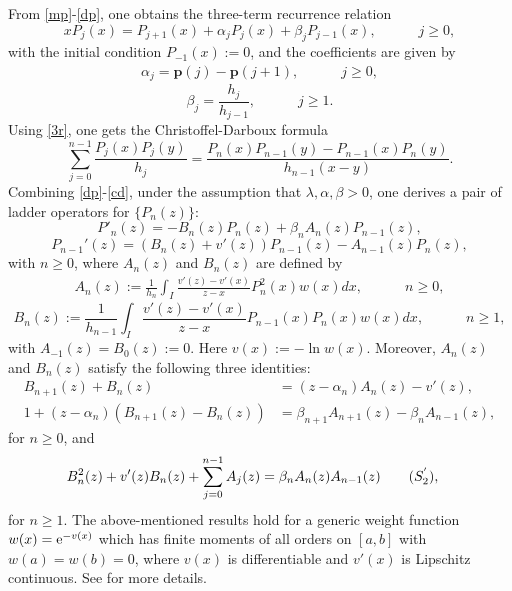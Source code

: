 \documentclass[12pt,a4paper]{article}    %
\numberwithin{equation}{section}
\begin{document}
From \eqref{mp}-\eqref{dp}, one obtains the three-term recurrence relation
\begin{equation}\label{3r}	 xP_j(x)=P_{j+1}(x)+\alpha_jP_j(x)+\beta_jP_{j-1}(x),\quad\qquad j\geq0,
\end{equation}
with the initial condition $P_{-1}(x):=0$, and the coefficients are given by
\begin{align}\label{alp}
\alpha_j=\textbf{p}(j)-\textbf{p}(j+1),\quad\qquad j\geq0,
\end{align}
\begin{equation}\label{bth}
	\beta_j=\frac{h_j}{h_{j-1}},\quad\qquad j\geq1.
\end{equation}
Using \eqref{3r}, one gets the Christoffel-Darboux formula
\begin{equation}\label{cd}	 \sum_{j=0}^{n-1}\frac{P_j(x)P_j(y)}{h_j}=\frac{P_n(x)P_{n-1}(y)-P_{n-1}(x)P_n(y)}{h_{n-1}(x-y)}.
\end{equation}
Combining \eqref{dp}-\eqref{cd}, under the assumption that $\lambda,\alpha,\beta>0$, one derives a pair of ladder operators for $\{P_n(z)\}$:
	\begin{equation*}
P'_n(z)=-B_n(z)P_n(z)+\beta_nA_n(z)P_{n-1}(z),
	\end{equation*}
	\begin{equation*}
P_{n-1}'(z)=\left(B_n(z)+v'(z)\right)P_{n-1}(z)-A_{n-1}(z)P_n(z),
	\end{equation*}
with $n\geq0$, where $A_n(z)$ and $B_n(z)$ are defined by
	\begin{align}\label{a-n}		 A_n(z):=\frac{1}{h_n}\int_I\frac{v'(z)-v'(x)}{z-x}P_n^2(x)w(x)dx,\quad\qquad n\geq0,
	\end{align}
	\begin{equation}\label{b-n}		 B_n(z):=\frac{1}{h_{n-1}}\int_I\frac{v'(z)-v'(x)}{z-x}P_{n-1}(x)P_n(x)w(x)dx,\quad\qquad n\geq1,
\end{equation}
with $A_{-1}(z)=B_0(z):=0$. Here $v(x):=-\ln w(x)$. Moreover, $A_n(z)$ and $B_n(z)$ satisfy the following three identities:
 \begin{align}
B_{n+1}(z)+B_n(z)&=(z-\alpha_n)A_n(z)-v'(z)\tag{$S_1$},\\
1+(z-\alpha_n)(B_{n+1}(z)-B_n(z))&=\beta_{n+1}A_{n+1}(z)-\beta_nA_{n-1}(z)\tag{$S_2$},			 \end{align}
for $n\geq0$, and
\begin{align}
B^2_n(z)+v'(z)B_n(z)+\sum_{j=0}^{n-1}A_j(z)&=\beta_nA_n(z)A_{n-1}(z)\tag{$S^{'}_2$},
\end{align}
for $n\geq1$. The above-mentioned results hold for a generic weight function $w(x)={\rm e}^{-v(x)}$ which has finite moments of all orders on $[a,b]$ with $w(a)=w(b)=0$, where $v(x)$ is differentiable and $v'(x)$ is Lipschitz continuous. See \cite{Magnus95,ChenIsmail97,WvA18} for more details.
\end{document}
